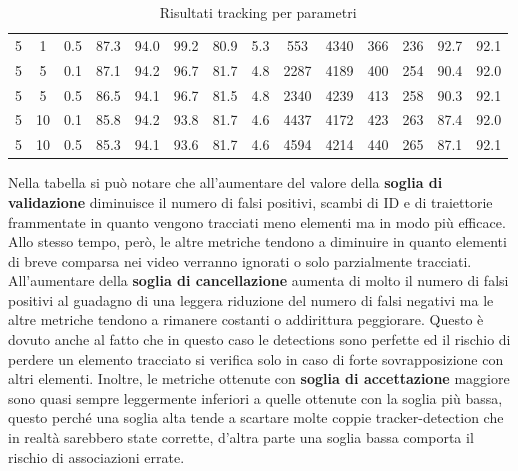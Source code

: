 \begin{table}[h!]
\begin{tabular}{|c|c|c|c|c|c|c|c|c|c|c|c|c|c|}
5 & 1 & 0.5 & 87.3 & 94.0 & 99.2 & 80.9 & 5.3 & 553 & 4340 & 366 & 236 & 92.7 & 92.1\\
5 & 5 & 0.1 & 87.1 & 94.2 & 96.7 & 81.7 & 4.8 & 2287 & 4189 & 400 & 254 & 90.4 & 92.0\\
5 & 5 & 0.5 & 86.5 & 94.1 & 96.7 & 81.5 & 4.8 & 2340 & 4239 & 413 & 258 & 90.3 & 92.1\\
5 & 10 & 0.1 & 85.8 & 94.2 & 93.8 & 81.7 & 4.6 & 4437 & 4172 & 423 & 263 & 87.4 & 92.0\\
5 & 10 & 0.5 & 85.3 & 94.1 & 93.6 & 81.7 & 4.6 & 4594 & 4214 & 440 & 265 & 87.1 & 92.1\\
\hline
\end{tabular}
\caption{Risultati tracking per parametri}
\label{risultati tracking per parametri}
\end{table}

Nella tabella si può notare che all'aumentare del valore della \textbf{soglia di validazione} diminuisce il numero di falsi positivi, scambi di ID e di traiettorie frammentate in quanto vengono tracciati meno elementi ma in modo più efficace. Allo stesso tempo, però, le altre metriche tendono a diminuire in quanto elementi di breve comparsa nei video verranno ignorati o solo parzialmente tracciati. All'aumentare della \textbf{soglia di cancellazione} aumenta di molto il numero di falsi positivi al guadagno di una leggera riduzione del numero di falsi negativi ma le altre metriche tendono a rimanere costanti o addirittura peggiorare. Questo è dovuto anche al fatto che in questo caso le detections sono perfette ed il rischio di perdere un elemento tracciato si verifica solo in caso di forte sovrapposizione con altri elementi. Inoltre, le metriche ottenute con \textbf{soglia di accettazione} maggiore sono quasi sempre leggermente inferiori a quelle ottenute con la soglia più bassa, questo perché una soglia alta tende a scartare molte coppie tracker-detection che in realtà sarebbero state corrette, d'altra parte una soglia bassa comporta il rischio di associazioni errate. 

\clearpage
